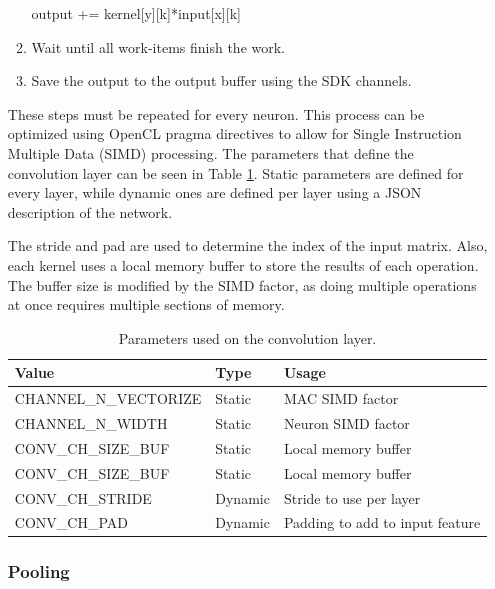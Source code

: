 \begin{enumerate}
\begin{enumerate}
    output += kernel[y][k]*input[x][k]
    \item Wait until all work-items finish the work.
    \item Save the output to the output buffer using the SDK channels.
\end{enumerate}

These steps must be repeated for every neuron. This process can be optimized using OpenCL
pragma directives to allow for Single Instruction Multiple Data (SIMD) processing. The
parameters that define the convolution layer can be seen in Table \ref{tab:convlayer}.
Static parameters are defined for every layer, while dynamic ones are defined per layer
using a JSON description of the network.

The stride and pad are used to determine the index of the input matrix.
Also, each kernel uses a local memory buffer to store the results of each operation.
The buffer size is modified by the SIMD factor, as doing multiple operations at
once requires multiple sections of memory.

\begin{table}[H]
    \begin{center}
        \caption{Parameters used on the convolution layer.}
        \begin{tabular}{lll}
        \hline
        Value                 & Type    & Usage                           \\ \hline
        CHANNEL\_N\_VECTORIZE & Static  & MAC SIMD factor                 \\
        CHANNEL\_N\_WIDTH     & Static  & Neuron SIMD factor              \\
        CONV\_CH\_SIZE\_BUF   & Static  & Local memory buffer             \\
        CONV\_CH\_SIZE\_BUF   & Static  & Local memory buffer             \\
        CONV\_CH\_STRIDE      & Dynamic & Stride to use per layer         \\
        CONV\_CH\_PAD         & Dynamic & Padding to add to input feature \\ \hline
        \end{tabular}
        \label{tab:convlayer}
    \end{center}
\end{table}

\subsubsection{Pooling}


\end{enumerate}
